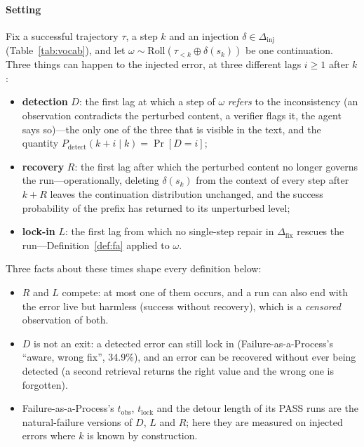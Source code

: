 \documentclass[10pt,a4paper]{article}
\begin{document}
\paragraph{Setting} Fix a successful trajectory $\tau$, a step $k$ and an injection $\delta\in\Delta_{\mathrm{inj}}$ (Table~\ref{tab:vocab}), and let $\omega\sim\mathrm{Roll}(\tau_{<k}\oplus\delta(s_k))$ be one continuation. Three things can happen to the injected error, at three different lags $i\ge1$ after $k$:
\begin{itemize}[leftmargin=1.1em]
\item \textbf{detection} $D$: the first lag at which a step of $\omega$ \emph{refers} to the inconsistency (an observation contradicts the perturbed content, a verifier flags it, the agent says so)---the only one of the three that is visible in the text, and the quantity $P_{\mathrm{detect}}(k{+}i\mid k)=\Pr[D{=}i]$;
\item \textbf{recovery} $R$: the first lag after which the perturbed content no longer governs the run---operationally, deleting $\delta(s_k)$ from the context of every step after $k{+}R$ leaves the continuation distribution unchanged, and the success probability of the prefix has returned to its unperturbed level;
\item \textbf{lock-in} $L$: the first lag from which no single-step repair in $\Delta_{\mathrm{fix}}$ rescues the run---Definition~\ref{def:fa} applied to $\omega$.
\end{itemize}
Three facts about these times shape every definition below:
\begin{itemize}[leftmargin=1.1em]
\item $R$ and $L$ compete: at most one of them occurs, and a run can also end with the error live but harmless (success without recovery), which is a \emph{censored} observation of both.
\item $D$ is not an exit: a detected error can still lock in (Failure-as-a-Process's ``aware, wrong fix'', 34.9\%), and an error can be recovered without ever being detected (a second retrieval returns the right value and the wrong one is forgotten).
\item Failure-as-a-Process's $t_{\mathrm{obs}}$, $t_{\mathrm{lock}}$ and the detour length of its PASS runs are the natural-failure versions of $D$, $L$ and $R$; here they are measured on injected errors where $k$ is known by construction.
\end{itemize}
\end{document}
